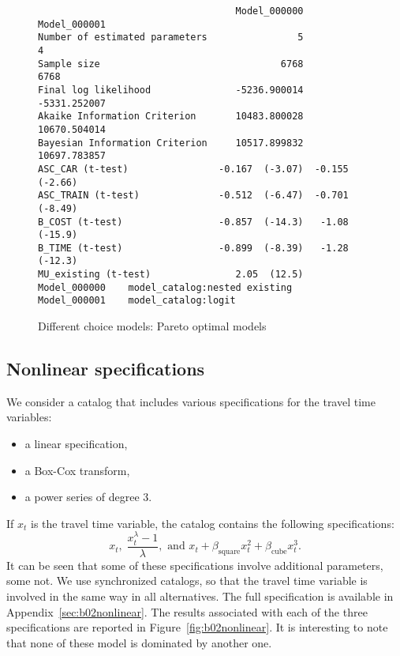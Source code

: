 \documentclass[12pt,a4paper]{article}
\begin{document}
\begin{landscape}
  \begin{figure}[p]
\begin{lstlisting}
                                   Model_000000     Model_000001
Number of estimated parameters                5                4
Sample size                                6768             6768
Final log likelihood               -5236.900014     -5331.252007
Akaike Information Criterion       10483.800028     10670.504014
Bayesian Information Criterion     10517.899832     10697.783857
ASC_CAR (t-test)                -0.167  (-3.07)  -0.155  (-2.66)
ASC_TRAIN (t-test)              -0.512  (-6.47)  -0.701  (-8.49)
B_COST (t-test)                 -0.857  (-14.3)   -1.08  (-15.9)
B_TIME (t-test)                 -0.899  (-8.39)   -1.28  (-12.3)
MU_existing (t-test)               2.05  (12.5)
Model_000000	model_catalog:nested existing
Model_000001	model_catalog:logit
\end{lstlisting}
\caption{\label{fig:b01model_2}Different choice models: Pareto optimal models}
  \end{figure}
\end{landscape}


\subsection{Nonlinear specifications}

We consider a catalog that includes various specifications for the travel time variables:
\begin{itemize}
\item a linear specification,
\item a Box-Cox transform,
\item a power series of degree 3.
\end{itemize}
If $x_t$ is the travel time variable, the catalog contains the following specifications:
\[
  x_t, \;
  \frac{x_t^\lambda - 1}{\lambda}, \text{ and }
  x_t + \beta_\text{square} x_t^2 + \beta_\text{cube} x_t^3.
\]
It can be seen that some of these specifications involve additional
parameters, some not. We use synchronized catalogs, so that the travel
time variable is involved in the same way in all alternatives. The
full specification is available in
Appendix~\ref{sec:b02nonlinear}. The results associated with each of
the three specifications are reported in
Figure~\vref{fig:b02nonlinear}. It is interesting to note that none of
these model is dominated by another one.
\end{document}
